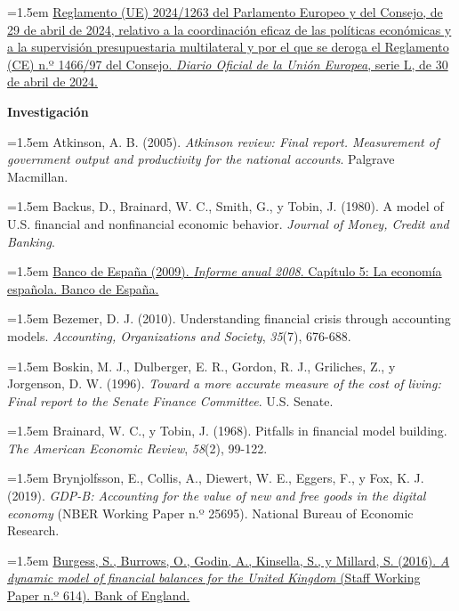 \documentclass[10pt,a4paper]{article}
\begin{document}
\noindent\hangindent=1.5em \href{https://eur-lex.europa.eu/eli/reg/2024/1263/oj}{Reglamento (UE) 2024/1263 del Parlamento Europeo y del Consejo, de 29 de abril de 2024, relativo a la coordinación eficaz de las políticas económicas y a la supervisión presupuestaria multilateral y por el que se deroga el Reglamento (CE) n.º 1466/97 del Consejo. \textit{Diario Oficial de la Unión Europea}, serie L, de 30 de abril de 2024.}

\textbf{Investigación}

\noindent\hangindent=1.5em Atkinson, A. B. (2005). \textit{Atkinson review: Final report. Measurement of government output and productivity for the national accounts}. Palgrave Macmillan.

\noindent\hangindent=1.5em Backus, D., Brainard, W. C., Smith, G., y Tobin, J. (1980). A model of U.S. financial and nonfinancial economic behavior. \textit{Journal of Money, Credit and Banking}.

\noindent\hangindent=1.5em \href{https://www.bde.es/f/webbde/SES/Secciones/Publicaciones/PublicacionesAnuales/InformesAnuales/08/cap5.pdf}{Banco de España (2009). \textit{Informe anual 2008}. Capítulo 5: La economía española. Banco de España.}

\noindent\hangindent=1.5em Bezemer, D. J. (2010). Understanding financial crisis through accounting models. \textit{Accounting, Organizations and Society}, \textit{35}(7), 676-688.

\noindent\hangindent=1.5em Boskin, M. J., Dulberger, E. R., Gordon, R. J., Griliches, Z., y Jorgenson, D. W. (1996). \textit{Toward a more accurate measure of the cost of living: Final report to the Senate Finance Committee}. U.S. Senate.

\noindent\hangindent=1.5em Brainard, W. C., y Tobin, J. (1968). Pitfalls in financial model building. \textit{The American Economic Review}, \textit{58}(2), 99-122.

\noindent\hangindent=1.5em Brynjolfsson, E., Collis, A., Diewert, W. E., Eggers, F., y Fox, K. J. (2019). \textit{GDP-B: Accounting for the value of new and free goods in the digital economy} (NBER Working Paper n.º 25695). National Bureau of Economic Research.

\noindent\hangindent=1.5em \href{https://www.bankofengland.co.uk/working-paper/2016/a-dynamic-model-of-financial-balances-for-the-uk}{Burgess, S., Burrows, O., Godin, A., Kinsella, S., y Millard, S. (2016). \textit{A dynamic model of financial balances for the United Kingdom} (Staff Working Paper n.º 614). Bank of England.}
\end{document}
